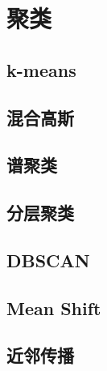 \chapter{聚类} %
\label{cha:聚类}
\section{k-means} %
\label{sec:k_means}

\section{混合高斯} %
\label{sec:混合高斯}

\section{谱聚类} %
\label{sec:谱聚类}

\section{分层聚类} %
\label{sec:分层聚类}

\section{DBSCAN} %
\label{sec:dbscan}

\section{Mean Shift} %
\label{sec:mean_shift}

\section{近邻传播} %
\label{sec:近邻传播}

